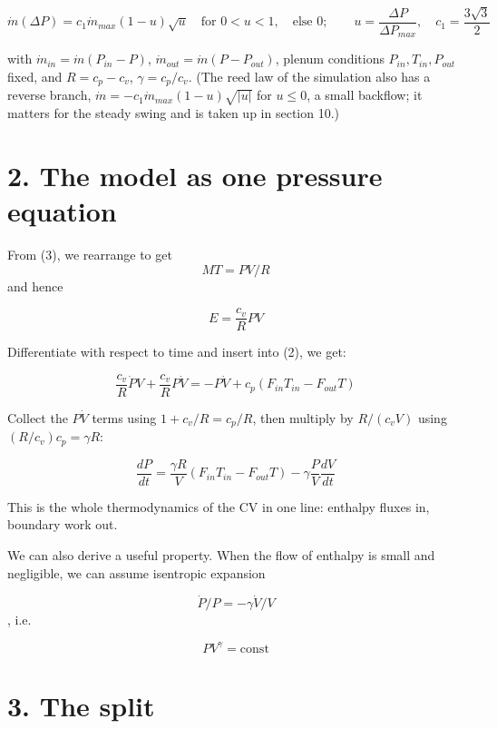 \documentclass[11pt]{article}
\begin{document}
\begin{equation}
\dot{m}(\Delta P) = c_1\dot m_{max}(1-u)\sqrt{u} \quad \text{for } 0 < u < 1, \quad \text{else } 0; \qquad u = \frac{\Delta P}{\Delta P_{max}}, \quad c_1 = \frac{3\sqrt 3}{2} \tag{6}
\end{equation}

with $ \dot{m}_{in} =  \dot{m}(P_{in}-P)$, $ \dot{m}_{out} =  \dot{m}(P-P_{out})$, plenum conditions $P_{in}, T_{in}, P_{out}$ fixed, and $R = c_p - c_v$, $\gamma = c_p/c_v$. (The reed law of the simulation also has a reverse branch, $\dot m = -c_1\dot m_{max}(1-u)\sqrt{\lvert u\rvert}$ for $u \le 0$, a small backflow; it matters for the steady swing and is taken up in section 10.)

\section*{2. The model as one pressure equation}

From (3), we rearrange to get
\[
MT = PV/R
\]
 and hence

\[
E = \frac{c_v}{R}PV
\]

 Differentiate with respect to time and insert into (2), we get:

\[
\frac{c_v}{R}\dot PV + \frac{c_v}{R}P\dot V = -P\dot V + c_p(F_{in}T_{in} - F_{out}T)
\]

Collect the $P\dot V$ terms using $1 + c_v/R = c_p/R$, then multiply by $R/(c_vV)$ using $(R/c_v)c_p = \gamma R$:

\begin{equation}
\frac{dP}{dt} = \frac{\gamma R}{V}\left(F_{in}T_{in} - F_{out}T\right) - \gamma\frac{P}{V}\frac{dV}{dt} \tag{7}
\end{equation}

This is the whole thermodynamics of the CV in one line: enthalpy fluxes in, boundary work out.

We can also derive a useful property. When the flow of enthalpy is small and negligible, we can assume isentropic expansion

\begin{equation}
\dot P/P = -\gamma\dot V/V \tag{8}
\end{equation}
, i.e.

\[
PV^{\gamma} = \mathrm{const}
\]

\section*{3. The split}
\end{document}
